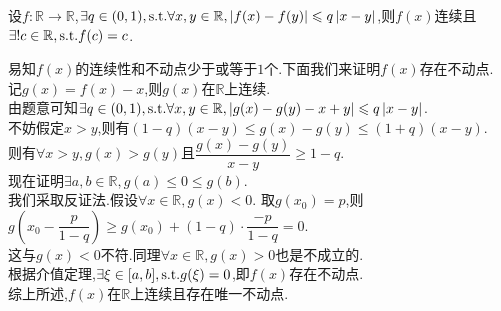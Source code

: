 \documentclass{ctexart}
\begin{document}
\begin{formal}[Lemma 2]
    设$f:\mathbb{R}\to\mathbb{R}$,$\exists q\in(0,1),\text{s.t.}\forall x,y\in\mathbb{R},\left\lvert f(x)-f(y)\right\rvert\leqslant q\left\lvert x-y\right\rvert$,则$f(x)$连续且$\exists!c\in\mathbb{R},\text{s.t.} f(c)=c$.
\end{formal}
\begin{solution}[Proof.]
    易知$f(x)$的连续性和不动点少于或等于$1$个.下面我们来证明$f(x)$存在不动点.\\
    记$g(x)=f(x)-x$,则$g(x)$在$\mathbb{R}$上连续.\\
    由题意可知$\exists q\in(0,1),\text{s.t.}\forall x,y\in\mathbb{R},\left\lvert g(x)-g(y)-x+y\right\rvert\leqslant q\left\lvert x-y\right\rvert$.\\
    不妨假定$x>y$,则有$(1-q)(x-y)\leqslant g(x)-g(y)\leqslant(1+q)(x-y).$\\
    则有$\forall x>y,g(x)>g(y)$且$\dfrac{g(x)-g(y)}{x-y}\geqslant 1-q$.\\
    现在证明$\exists a,b\in\mathbb{R},g(a)\leqslant 0\leqslant g(b)$.\\
    我们采取反证法.假设$\forall x\in\mathbb{R},g(x)<0$.
    取$g(x_0)=p$,则$g(x_0-\dfrac{p}{1-q})\geqslant g(x_0)+(1-q)\cdot\dfrac{-p}{1-q}=0$.\\
    这与$g(x)<0$不符.同理$\forall x\in\mathbb{R},g(x)>0$也是不成立的.\\
    根据介值定理,$\exists\xi\in[a,b],\text{s.t.} g(\xi)=0$,即$f(x)$存在不动点.\\
    综上所述,$f(x)$在$\mathbb{R}$上连续且存在唯一不动点.
\end{solution}
\end{document}
